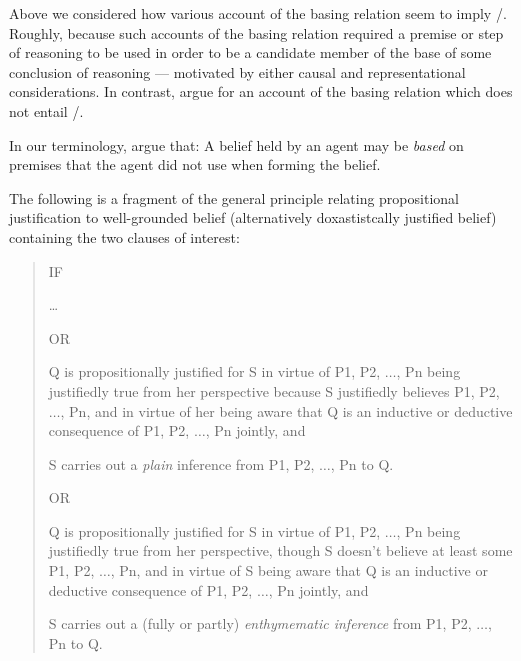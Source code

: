 \begin{note}
  Above we considered how various account of the basing relation seem to imply \issueConstraint{}/\issueInclusion{}.
  Roughly, because such accounts of the basing relation required a premise or step of reasoning to be used in order to be a candidate member of the base of some conclusion of reasoning --- motivated by either causal and representational considerations.
  In contrast, \citeauthor{Moretti:2019wx} argue for an account of the basing relation which does not entail \issueConstraint{}/\issueInclusion{}.

  In our terminology, \citeauthor{Moretti:2019wx} argue that: A belief held by an agent may be \emph{based} on premises that the agent did not use when forming the belief.

  The following is a fragment of the general principle relating propositional justification to well-grounded belief (alternatively doxastistcally justified belief) containing the two clauses of interest:

  \begin{quote}
    IF

    \dots

    OR

    \begin{enumerate*}[label=(\arabic*.2\(^{\ast}\))]
    \item
      \label{LT:1.2}
      Q is propositionally justified for S in virtue of P1, P2, \(\dots\), Pn being justifiedly true from her perspective because S justifiedly believes P1, P2, \(\dots\), Pn, and in virtue of her being aware that Q is an inductive or deductive consequence of P1, P2, \(\dots\), Pn jointly, and
    \item
      \label{LT:2.2}
      S carries out a \emph{plain} inference from P1, P2, \(\dots\), Pn to Q.
    \end{enumerate*}

    OR

    \begin{enumerate*}[label=(\arabic*.3), ref=(\arabic*.3)]
    \item
      \label{LT:1.3}
      Q is propositionally justified for S in virtue of P1, P2, \(\dots\), Pn being justifiedly true from her perspective, though S doesn't believe at least some P1, P2, \(\dots\), Pn, and in virtue of S being aware that Q is an inductive or deductive consequence of P1, P2, \(\dots\), Pn jointly, and
    \item
      \label{LT:2.3}
      S carries out a (fully or partly) \emph{enthymematic inference} from P1, P2, \(\dots\), Pn to Q.
    \end{enumerate*}


\end{quote}
\end{note}
